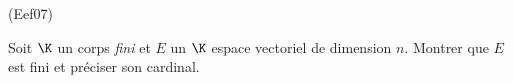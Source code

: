 \begin{tiny}(Eef07)\end{tiny}
Soit $\K$ un corps \emph{fini} et $E$ un $\K$ espace vectoriel de dimension $n$. Montrer que $E$ est fini et préciser son cardinal.